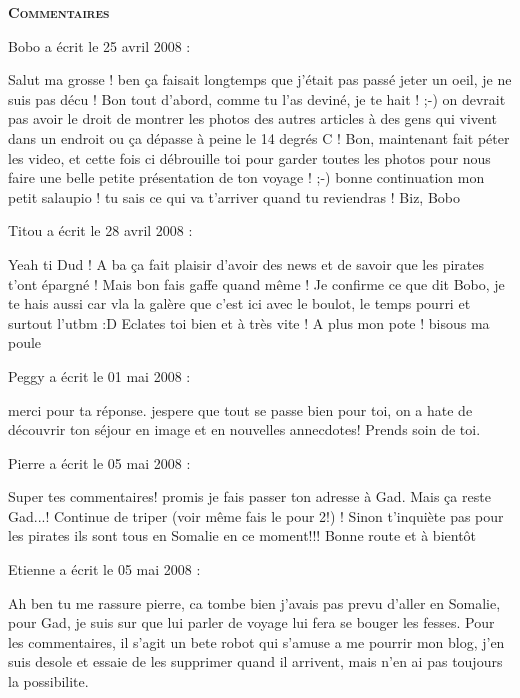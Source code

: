 \bigskip
\textbf{\textsc{Commentaires}}

\medskip
Bobo a écrit le 25 avril 2008 :
\begin{displayquote}
Salut ma grosse ! ben ça faisait longtemps que j'était pas passé jeter un oeil, je ne suis pas décu !
Bon tout d'abord, comme tu l'as deviné, je te hait ! ;-) on devrait pas avoir le droit de montrer les photos des autres articles à des gens qui vivent dans un endroit ou ça dépasse à peine le 14 degrés C !
Bon, maintenant fait péter les video, et cette fois ci débrouille toi pour garder toutes les photos pour nous faire une belle petite présentation de ton voyage ! ;-)
bonne continuation mon petit salaupio ! tu sais ce qui va t'arriver quand tu reviendras !
Biz, Bobo
\end{displayquote}

\medskip
Titou a écrit le 28 avril 2008 :
\begin{displayquote}
Yeah ti Dud !
A ba ça fait plaisir d'avoir des news et de savoir que les pirates t'ont épargné ! Mais bon fais gaffe quand même !
Je confirme ce que dit Bobo, je te hais aussi car vla la galère que c'est ici avec le boulot, le temps pourri et surtout l'utbm :D Eclates toi bien et à très vite !
A plus mon pote !
bisous ma poule
\end{displayquote}

\medskip
Peggy a écrit le 01 mai 2008 :
\begin{displayquote}
merci pour ta réponse. jespere que tout se passe bien pour toi, on a hate de découvrir ton séjour en image et en nouvelles annecdotes!
Prends soin de toi.
\end{displayquote}

\medskip
Pierre a écrit le 05 mai 2008 :
\begin{displayquote}
Super tes commentaires!
promis je fais passer ton adresse à Gad.
Mais ça reste Gad...!
Continue de triper (voir même fais le pour 2!) !
Sinon t'inquiète pas pour les pirates ils sont tous en Somalie en ce moment!!!
Bonne route et à bientôt
\end{displayquote}

\medskip
Etienne a écrit le 05 mai 2008 :
\begin{displayquote}
Ah ben tu me rassure pierre, ca tombe bien j'avais pas prevu d'aller en Somalie, pour Gad, je suis sur que lui parler de voyage lui fera se bouger les fesses.
Pour les commentaires, il s'agit un bete robot qui s'amuse a me pourrir mon blog, j'en suis desole et essaie de les supprimer quand il arrivent, mais n'en ai pas toujours la possibilite.
\end{displayquote}

